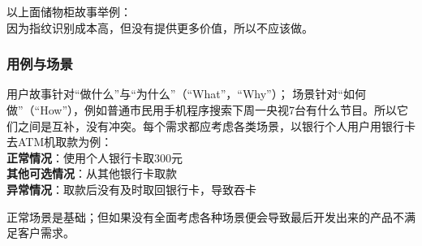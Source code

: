 以上面储物柜故事举例：\\
因为指纹识别成本高，但没有提供更多价值，所以不应该做。

\hypertarget{ux7528ux4f8bux4e0eux573aux666f}{%
\subsubsection{用例与场景}\label{ux7528ux4f8bux4e0eux573aux666f}}

用户故事针对``做什么''与``为什么''（``What''，``Why''）；
场景针对``如何做''（``How''），例如普通市民用手机程序搜索下周一央视7台有什么节目。所以它们之间是互补，没有冲突。每个需求都应考虑各类场景，以银行个人用户用银行卡去ATM机取款为例：\\
\textbf{正常情况}：使用个人银行卡取300元\\
\textbf{其他可选情况}：从其他银行卡取款\\
\textbf{异常情况}：取款后没有及时取回银行卡，导致吞卡

正常场景是基础；但如果没有全面考虑各种场景便会导致最后开发出来的产品不满足客户需求。

